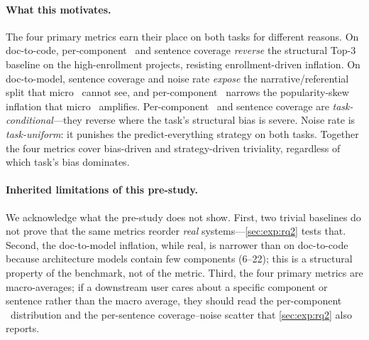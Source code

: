 \paragraph{What this motivates.}
The four primary metrics earn their place on both tasks for different reasons.
On doc-to-code, per-component \fone\ and sentence coverage \emph{reverse} the structural Top-3 baseline on the high-enrollment projects, resisting enrollment-driven inflation.
On doc-to-model, sentence coverage and noise rate \emph{expose} the narrative/referential split that micro \fone\ cannot see, and per-component \fone\ narrows the popularity-skew inflation that micro \fone\ amplifies.
Per-component \fone\ and sentence coverage are \emph{task-conditional}---they reverse where the task's structural bias is severe.
Noise rate is \emph{task-uniform}: it punishes the predict-everything strategy on both tasks.
Together the four metrics cover bias-driven and strategy-driven triviality, regardless of which task's bias dominates.

\paragraph{Inherited limitations of this pre-study.}
We acknowledge what the pre-study does not show.
First, two trivial baselines do not prove that the same metrics reorder \emph{real} systems---\autoref{sec:exp:rq2} tests that.
Second, the doc-to-model inflation, while real, is narrower than on doc-to-code because architecture models contain few components (6--22); this is a structural property of the benchmark, not of the metric.
Third, the four primary metrics are macro-averages; if a downstream user cares about a specific component or sentence rather than the macro average, they should read the per-component \fone\ distribution and the per-sentence coverage--noise scatter that \autoref{sec:exp:rq2} also reports.



